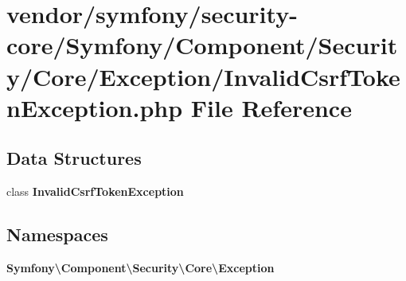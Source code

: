 \section{vendor/symfony/security-\/core/\+Symfony/\+Component/\+Security/\+Core/\+Exception/\+Invalid\+Csrf\+Token\+Exception.php File Reference}
\label{_invalid_csrf_token_exception_8php}
\subsection*{Data Structures}
\begin{DoxyCompactItemize}
\item 
class {\bf Invalid\+Csrf\+Token\+Exception}
\end{DoxyCompactItemize}
\subsection*{Namespaces}
\begin{DoxyCompactItemize}
\item 
 {\bf Symfony\textbackslash{}\+Component\textbackslash{}\+Security\textbackslash{}\+Core\textbackslash{}\+Exception}
\end{DoxyCompactItemize}
